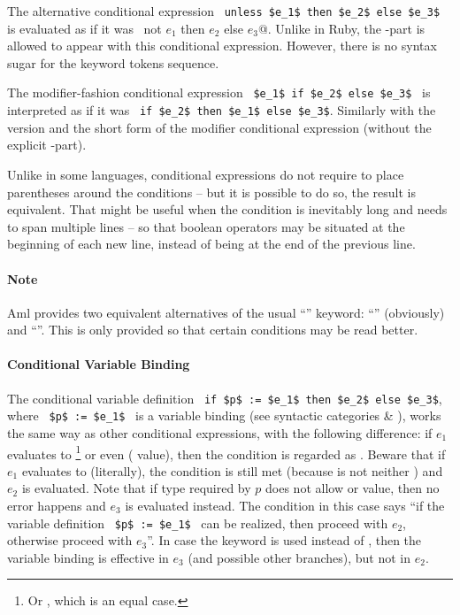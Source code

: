 The alternative conditional expression ~\lstinline!unless $e_1$ then $e_2$ else $e_3$!~ is evaluated as if it was ~\lstinline@if not $e_1$ then $e_2$ else $e_3$@. Unlike in Ruby, the -part is allowed to appear with this conditional expression. However, there is no syntax sugar for the  keyword tokens sequence. 

The modifier-fashion conditional expression ~\lstinline!$e_1$ if $e_2$ else $e_3$!~ is interpreted as if it was ~\lstinline!if $e_2$ then $e_1$ else $e_3$!. Similarly with the  version and the short form of the modifier conditional expression (without the explicit -part). 

Unlike in some languages, conditional expressions do not require to place parentheses around the conditions -- but it is possible to do so, the result is equivalent. That might be useful when the condition is inevitably long and needs to span multiple lines -- so that boolean operators may be situated at the beginning of each new line, instead of being at the end of the previous line. 

\paragraph{Note}
Aml provides two equivalent alternatives of the usual ``'' keyword: ``'' (obviously) and ``''. This is only provided so that certain conditions may be read better.

\paragraph{Conditional Variable Binding}
The conditional variable definition ~\lstinline!if $p$ := $e_1$ then $e_2$ else $e_3$!, where ~\lstinline!$p$ := $e_1$!~ is a variable binding (see syntactic categories  \& ), works the same way as other conditional expressions, with the following difference: if $e_1$ evaluates to \footnote{Or , which is an equal case.} or even \code{()} ( value), then the condition is regarded as . Beware that if $e_1$ evaluates to  (literally), the condition is still met (because  is not  neither \code{()}) and $e_2$ is evaluated. Note that if type required by $p$ does not allow  or \code{()} value, then no error happens and $e_3$ is evaluated instead. The condition in this case says ``if the variable definition ~\lstinline!$p$ := $e_1$!~ can be realized, then proceed with $e_2$, otherwise proceed with $e_3$''. In case the  keyword is used instead of , then the variable binding is effective in $e_3$ (and possible other  branches), but not in $e_2$.






